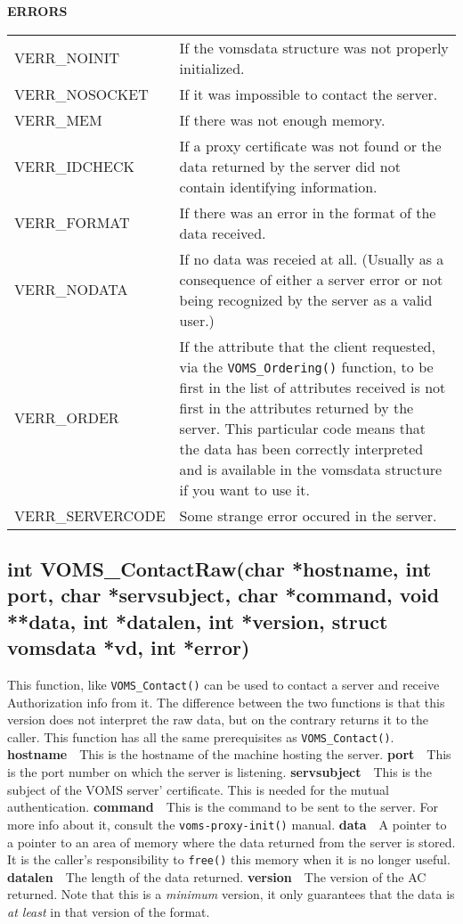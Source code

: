 \documentclass[a4paper]{book}
\newcommand{\errors}{\noindent \textbf{ERRORS}\newline}
\newcommand{\parameter}[1]{\newline\textbf{#1}\ \ }
\begin{document}
\errors
\bigskip\begin{tabular}{lp{3in}}
VERR\_NOINIT   & If the vomsdata structure was not properly
initialized.\\
VERR\_NOSOCKET & If it was impossible to contact the server.\\
VERR\_MEM      & If there was not enough memory.\\
VERR\_IDCHECK  & If a proxy certificate was not found or the data
returned by the server did not contain identifying information.\\
VERR\_FORMAT   & If there was an error in the format of the data
received.\\
VERR\_NODATA   & If no data was receied at all. (Usually as a
consequence of either a server error or not being recognized by the
server as a valid user.)\\
VERR\_ORDER    & If the attribute that the client requested, via the
\verb|VOMS_Ordering()| function, to be first in the list of attributes
received is not first in the attributes returned by the server. This
particular code means that the data has been correctly interpreted and
is available in the vomsdata structure if you want to use it.\\
VERR\_SERVERCODE & Some strange error occured in the server.\\
\end{tabular}


\subsection{int VOMS\_ContactRaw(char *hostname, int port, char *servsubject, char *command, void **data, int *datalen, int *version, struct vomsdata *vd, int *error)}

This function, like \verb|VOMS_Contact()| can be used to contact a
server and receive Authorization info from it.  The difference between
the two functions is that this version does not interpret the raw
data, but on the contrary returns it to the caller.  This function has
all the same prerequisites as \verb|VOMS_Contact()|.
\parameter{hostname}{This is the hostname of the machine hosting the
  server.}
\parameter{port}{This is the port number on which the server is
  listening.}
\parameter{servsubject}{This is the subject of the VOMS server'
  certificate.  This is needed for the mutual authentication.}
\parameter{command}{This is the command to be sent to the server.  For
  more info about it, consult the \verb|voms-proxy-init()| manual.}
\parameter{data}{A pointer to a pointer to an area of memory where the
  data returned from the server is stored.  It is the caller's
  responsibility to \verb|free()| this memory when it is no longer
  useful.}
\parameter{datalen}{The length of the data returned.}
\parameter{version}{The version of the AC returned.  Note that this is
  a \emph{minimum} version, it only guarantees that the data is \emph{at
  least} in that version of the format.}
\end{document}

